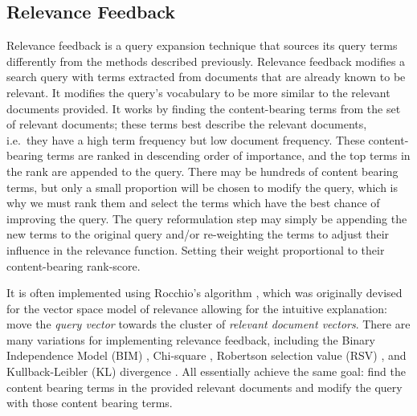 










\subsection{Relevance Feedback}
Relevance feedback is a query expansion technique that sources its query terms differently from the methods described previously. Relevance feedback modifies a search query with terms extracted from documents that are already known to be relevant. It modifies the query's vocabulary to be more similar to the relevant documents provided. It works by finding the content-bearing terms from the set of relevant documents; these terms best describe the relevant documents, i.e.\ they have a high term frequency but low document frequency. These content-bearing terms are ranked in descending order of importance, and the top terms in the rank are appended to the query. There may be hundreds of content bearing terms, but only a small proportion will be chosen to modify the query, which is why we must rank them and select the terms which have the best chance of improving the query. The query reformulation step may simply be appending the new terms to the original query and/or re-weighting the terms to adjust their influence in the relevance function. Setting their weight proportional to their content-bearing rank-score.

It is often implemented using Rocchio's algorithm \cite{rocchio1971relevance}, which was originally devised for the vector space model of relevance allowing for the intuitive explanation: move the \textit{query vector} towards the cluster of \textit{relevant document vectors}. There are many variations for implementing relevance feedback, including the Binary Independence Model (BIM) \cite{robertsonandsparckjones}, Chi-square \cite{article123}, Robertson selection value (RSV) \cite{Robertson:1991:TSQ:104889.104901}, and Kullback-Leibler (KL) divergence \cite{Carpineto:2001:IAA:366836.366860}. All essentially achieve the same goal: find the content bearing terms in the provided relevant documents and modify the query with those content bearing terms.

